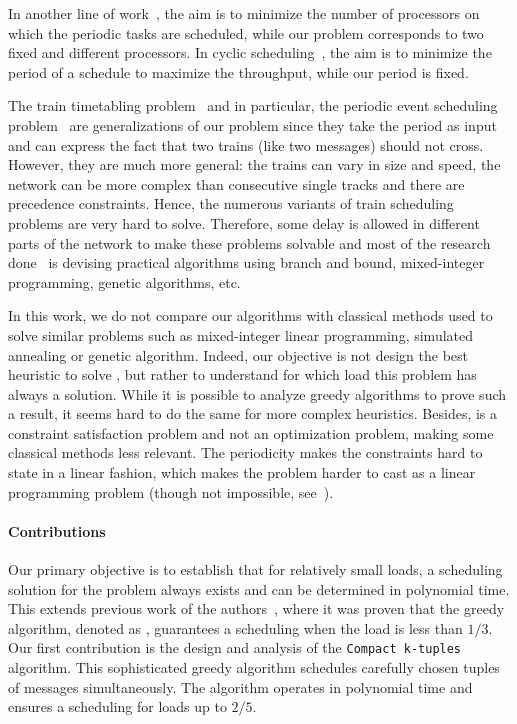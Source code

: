 \documentclass[pdflatex,sn-mathphys,iicol]{sn-jnl}%
\theoremstyle{thmstyleone}%
\theoremstyle{thmstyletwo}%
\theoremstyle{thmstylethree}%
\begin{document}
 In another line of work~\cite{korst1991periodic,hanen1993cyclic}, the aim is to minimize the number of processors on which the periodic tasks are scheduled, while our problem corresponds to two fixed and different processors. In cyclic scheduling~\cite{levner2010complexity}, the aim is to minimize the period of a schedule to maximize the throughput, while our period is fixed. 

 The train timetabling problem~\cite{lusby2011railway} and in particular, the periodic event scheduling problem~\cite{serafini1989mathematical} are generalizations of our problem since they take the period as input and can express the fact that two trains (like two messages) should not cross. However, they are much more general: the trains can vary in size and speed, the network can be more complex than consecutive single tracks and there are precedence constraints. Hence, the numerous variants of train scheduling problems are very hard to solve. Therefore, some delay is allowed in different parts of the network to make these problems solvable and most of the research done~\cite{lusby2011railway} is devising practical algorithms using branch and bound, mixed-integer programming, genetic algorithms, etc. 
 
In this work, we do not compare our algorithms with classical methods used to solve similar problems such as mixed-integer linear programming, simulated annealing or genetic algorithm. Indeed, our objective is not design the best heuristic to solve \pma, but rather to understand for which load this problem has always a solution. While it is possible to analyze greedy algorithms to prove such a result, it seems hard to do the same for more complex heuristics. Besides, \pma is a constraint satisfaction problem and not an optimization problem, making some classical methods less relevant. The periodicity makes the constraints hard to state in a linear fashion, which makes the problem harder to cast as a linear programming problem (though not impossible, see~\cite{bartharxiv2018deterministic}). 


\paragraph*{Contributions}


Our primary objective is to establish that for relatively small loads, a scheduling solution for the \pma problem always exists and can be determined in polynomial time. 
This extends previous work of the authors~\cite{bartharxiv2018deterministic}, where it was proven that the greedy algorithm, denoted as \metaoffset, guarantees a scheduling when the load is less than $1/3$.
Our first contribution is the design and analysis of the \texttt{Compact k-tuples} algorithm. This sophisticated greedy algorithm schedules carefully chosen tuples of messages simultaneously.
The algorithm operates in polynomial time and ensures a scheduling for loads up to $2/5$.
\end{document}
